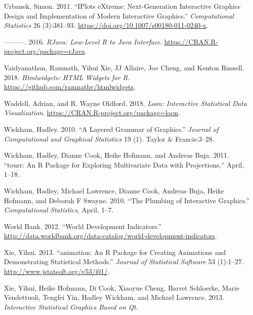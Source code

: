 \documentclass[12pt,]{article}
\theoremstyle{definition}
\theoremstyle{definition}
\theoremstyle{definition}
\theoremstyle{remark}
\begin{document}
\leavevmode\hypertarget{ref-Urbanek2011}{}%
Urbanek, Simon. 2011. ``IPlots eXtreme: Next-Generation Interactive
Graphics Design and Implementation of Modern Interactive Graphics.''
\emph{Computational Statistics} 26 (3):381--93.
\url{https://doi.org/10.1007/s00180-011-0240-x}.

\leavevmode\hypertarget{ref-rJava}{}%
---------. 2016. \emph{RJava: Low-Level R to Java Interface}.
\url{https://CRAN.R-project.org/package=rJava}.

\leavevmode\hypertarget{ref-htmlwidgets}{}%
Vaidyanathan, Ramnath, Yihui Xie, JJ Allaire, Joe Cheng, and Kenton
Russell. 2018. \emph{Htmlwidgets: HTML Widgets for R}.
\url{https://github.com/ramnathv/htmlwidgets}.

\leavevmode\hypertarget{ref-loon}{}%
Waddell, Adrian, and R. Wayne Oldford. 2018. \emph{Loon: Interactive
Statistical Data Visualization}.
\url{https://CRAN.R-project.org/package=loon}.

\leavevmode\hypertarget{ref-ggplot2-paper}{}%
Wickham, Hadley. 2010. ``A Layered Grammar of Graphics.'' \emph{Journal
of Computational and Graphical Statistics} 19 (1). Taylor \&
Francis:3--28.

\leavevmode\hypertarget{ref-tourr}{}%
Wickham, Hadley, Dianne Cook, Heike Hofmann, and Andreas Buja. 2011.
``tourr: An R Package for Exploring Multivariate Data with
Projections,'' April, 1--18.

\leavevmode\hypertarget{ref-plumbing}{}%
Wickham, Hadley, Michael Lawrence, Dianne Cook, Andreas Buja, Heike
Hofmann, and Deborah F Swayne. 2010. ``The Plumbing of Interactive
Graphics.'' \emph{Computational Statistics}, April, 1--7.

\leavevmode\hypertarget{ref-WorldBank}{}%
World Bank. 2012. ``World Development Indicators.''
\url{http://data.worldbank.org/data-catalog/world-development-indicators}.

\leavevmode\hypertarget{ref-animation}{}%
Xie, Yihui. 2013. ``animation: An R Package for Creating Animations and
Demonstrating Statistical Methods.'' \emph{Journal of Statistical
Software} 53 (1):1--27. \url{http://www.jstatsoft.org/v53/i01/}.

\leavevmode\hypertarget{ref-cranvas}{}%
Xie, Yihui, Heike Hofmann, Di Cook, Xiaoyue Cheng, Barret Schloerke,
Marie Vendettuoli, Tengfei Yin, Hadley Wickham, and Michael Lawrence.
2013. \emph{Interactive Statistical Graphics Based on Qt}.
\end{document}
